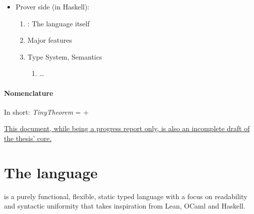 \documentclass[a4paper, 11pt]{article}
\theoremstyle{remark}\newtheorem*{remark}{Remark}
\theoremstyle{definition}\newtheorem*{definition}{Definition}
\begin{document}
\begin{itemize}
\begin{enumerate}
\begin{enumerate}
\begin{enumerate}
              \item Runtime
            \end{enumerate}
        \end{enumerate}
      \item FFI Utilities (SBCL)
      \item CLI Interfaces (Interpreter, Compilers)
        \begin{enumerate}
          \item \texttt{Tigrisi}: IR-based REPL
          \item \texttt{Tigrisl}: Compiler
          \item \texttt{Tigris}: (Legacy, deprecated) Source-based REPL
        \end{enumerate}
      \item Misc: Dependently-typed table printer
    \end{enumerate}
  \item Prover side (in Haskell):
    \begin{enumerate}
      \item \Tigrisd: The language itself
      \item Major features
      \item Type System, Semantics
        \begin{enumerate}
          \item \ldots
        \end{enumerate}
    \end{enumerate}
\end{itemize}

\paragraph*{Nomenclature} In short: \emph{TinyTheorem} = \Tigris + \Tigrisd\vspace{1cm}

\noindent\underline{This document, while being a progress report only, is also an incomplete draft of the thesis' core.}

\pagebreak
\setcounter{tocdepth}{5}
\tableofcontents
\pagebreak

\section{The \Tigris language}
\Tigris is a purely functional, flexible, static typed language with a focus
on readability and syntactic uniformity that
takes inspiration from Lean, OCaml and Haskell.
\end{document}
